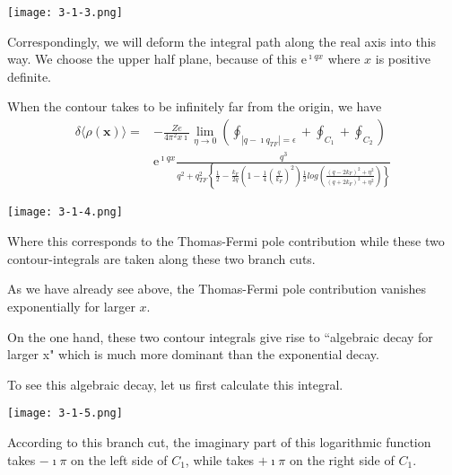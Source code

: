 \begin{itemize}
\begin{center} \label{Fig3.1.3}
\texttt{[image: 3-1-3.png]}
\end{center}

Correspondingly, we will deform the integral path along the real axis into this way. We choose the upper half plane, because of this $\mathrm{e}^{\imath q x}$ where $x$ is positive definite.

When the contour takes to be infinitely far from the origin, we have
\begin{equation} \label{Eqs3.1.32} \begin{split}
\delta \langle \rho(\mathbf{x}) \rangle =& -\frac{Z e}{4\pi^2 x \imath} \lim_{\eta \rightarrow 0} \left( \oint_{|q-\imath q_{TF}| = \epsilon} + \oint_{C_1} + \oint_{C_2} \right)\\
& \mathrm{e}^{\imath q x} \frac{q^3}{q^2 + q_{TF}^2 \left\{\frac{1}{2}-\frac{k_F}{2q}\left( 1-\frac{1}{4}(\frac{q}{k_F})^2 \right) \frac{1}{2} log \left( \frac{(q-2 k_F)^2 + \eta^2}{(q + 2 k_F)^2 + \eta^2}\right) \right\}}
\end{split}\end{equation}

\begin{center} \label{Fig3.1.4}
\texttt{[image: 3-1-4.png]}
\end{center}

Where this corresponds to the Thomas-Fermi pole contribution while these two contour-integrals are taken along these two branch cuts.

As we have already see above, the Thomas-Fermi pole contribution vanishes exponentially for larger $x$.

On the one hand, these two contour integrals give rise to ``algebraic decay for larger x" which is much more dominant than the exponential decay.

To see this algebraic decay, let us first calculate this integral.
\begin{center} \label{Fig3.1.5}
\texttt{[image: 3-1-5.png]}
\end{center}

According to this branch cut, the imaginary part of this logarithmic function takes $-\imath \pi$ on the left side of $C_1$, while takes $+\imath \pi$ on the right side of $C_1$.


\end{itemize}
